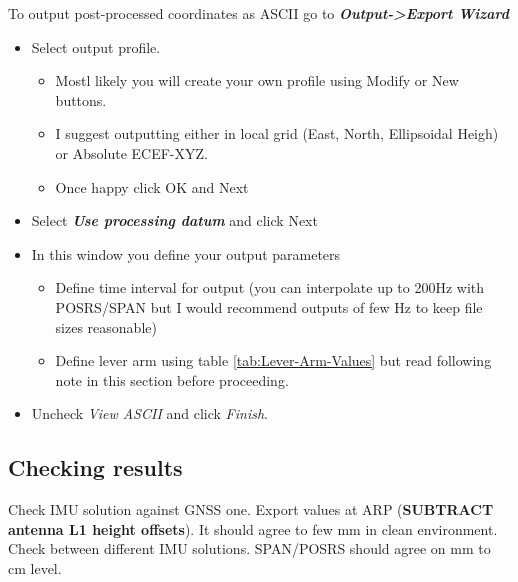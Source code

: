 \documentclass[british,DIV=calc, paper=a4, fontsize=12pt, onecolumn]{scrartcl}
\begin{document}
To output post-processed coordinates as ASCII go to \textbf{\emph{Output->Export Wizard}} 	
\begin{itemize}
	\item Select output profile. 
	\begin{itemize}
		\item Mostl likely you will create your own profile using Modify or New buttons.
		\item I suggest outputting either in local grid (East, North, Ellipsoidal Heigh) or Absolute ECEF-XYZ.
		\item Once happy click OK and Next
	\end{itemize}
	\item Select \textbf{\emph{Use processing datum}} and click Next
	\item In this window you define your output parameters
	\begin{itemize}
		\item Define time interval for output (you can interpolate up to 200Hz with POSRS/SPAN but I would recommend outputs of few Hz to keep file sizes reasonable)
		\item Define lever arm using table \ref{tab:Lever-Arm-Values} but read following note in this section before proceeding. 
	\end{itemize}
	
	
	
	\item Uncheck \emph{View ASCII} and click \emph{Finish}.
\end{itemize}




\subsection{Checking results}
Check IMU solution against GNSS one. Export values at ARP (\textbf{SUBTRACT antenna L1 height offsets}). It should agree to few mm in clean environment.  Check between different IMU solutions. SPAN/POSRS should agree on mm to cm level.
\end{document}
